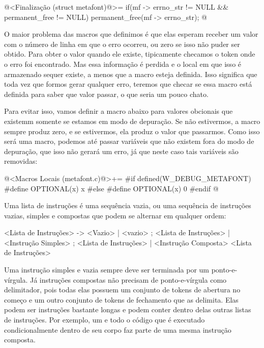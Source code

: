 \iniciocodigo
@<Finalização (struct metafont)@>=
if(mf -> errno_str != NULL && permanent_free != NULL)
  permanent_free(mf -> errno_str);
@
\fimcodigo

O maior problema das macros que definimos é que elas esperam receber
um valor com o número de linha em que o erro ocorreu, ou zero se isso
não puder ser obtido. Para obter o valor quando ele existe,
tipicamente checamos o token onde o erro foi encontrado. Mas essa
informação é perdida e o local em que isso é armazenado sequer existe,
a menos que a macro  esteja
definida. Isso significa que toda vez que formos gerar qualquer erro,
teremos que checar se essa macro está definida para saber que valor
passar, o que seria um pouco chato.

Para evitar isso, vamos definir a macro abaixo para valores obcionais
que existemm somente se estamos em modo de depuração. Se não
estivermos, a macro sempre produz zero, e se estivermos, ela produz o
valor que passarmos. Como isso será uma macro, podemos até passar
variáveis que não existem fora do modo de depuração, que isso não
gerará um erro, já que neste caso tais variáveis são removidas:

\iniciocodigo
@<Macros Locais (metafont.c)@>+=
#if defined(W_DEBUG_METAFONT)
#define OPTIONAL(x) x
#else
#define OPTIONAL(x) 0
#endif
@
\fimcodigo



Uma lista de instruções é uma sequência vazia, ou uma sequência de
instruções vazias, simples e compostas que podem se alternar em
qualquer ordem:

\alinhaverbatim
<Lista de Instruções> -> <Vazio> |
                         <vazio> ; <Lista de Instruções> |
                         <Instrução Simples> ; <Lista de Instruções> |
                         <Instrução Composta> <Lista de Instruções>
\alinhanormal

Uma instrução simples e vazia sempre deve ser terminada por um
ponto-e-vírgula. Já instruções compostas não precisam de
ponto-e-vírgula como delimitador, pois todas elas possuem um conjunto
de tokens de abertura no começo e um outro conjunto de tokens de
fechamento que as delimita. Elas podem ser instruções bastante longas
e podem conter dentro delas outras listas de instruções. Por exemplo,
um  e todo o código que é executado condicionalmente
dentro de seu corpo faz parte de uma mesma instrução composta.


